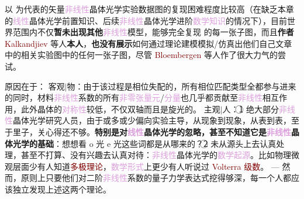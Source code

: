 以  为代表的矢量\textcolor{Plum}{非线性}\textcolor{PineGreen}{晶体光学}\textcolor{NavyBlue}{实验数据图}的复现困难程度比较高（在缺乏本章的\textcolor{Plum}{线性}\textcolor{PineGreen}{晶体光学}前置知识、后续\textcolor{Plum}{非线性}\textcolor{PineGreen}{晶体光学}进阶\textcolor{Plum}{数学知识}的情况下），目前世界范围内不仅\textbf{暂未出现其他}\textcolor{Plum}{非线性}模型，能够完全复现  的每一张子图，而且\textbf{作者} \textcolor{Maroon}{Kalkandjiev} 等人\textbf{本人}，\textbf{也没有展示}如何通过\textcolor{NavyBlue}{理论建模}模拟/仿真出他们自己文章中的\textcolor{NavyBlue}{相关实验图}中的任何一张\textcolor{NavyBlue}{子图}\cite{zolotovskayaSecondharmonicConicalRefraction2011,kroupaSecondharmonicConicalRefraction2010,alekseevaShadowConicalRefraction1999,shihConicalRefractionSecondHarmonic1969,schellLaserStudiesInternal1978,velichkinaDemonstrationPhenomenaConical1980,stroganovConicalRefractionSecond1980,illarionovExperimentalObservationConical1979,féveExperimentalStudyInternal1994,grantFrequencydoubledConicallyrefractedGaussian2014,maSumfrequencyGenerationFemtosecond2018,peetFrequencyDoublingLaser2011}，尽管 \textcolor{Maroon}{Bloembergen} 等人作了很大力气的尝试\cite{shihConicalRefractionSecondHarmonic1969,schellLaserStudiesInternal1978}。

原因在于：{\one} 客观$\Big|$物：由于该过程是\textcolor{PineGreen}{相位失配}的，所有\textcolor{PineGreen}{相位匹配类型}全都参与进来的同时，材料\textcolor{Plum}{非线性}系数的所有\textcolor{Plum}{非零张量元}/\textcolor{Plum}{分量}也几乎都贡献至\textcolor{Plum}{非线性}相互作用\cite{kroupaSecondharmonicConicalRefraction2010}，此外晶体的\textcolor{Plum}{对称性}较低，不仅\textcolor{NavyBlue}{双轴}而且是\textcolor{NavyBlue}{旋光}的\cite{zolotovskayaSecondharmonicConicalRefraction2011}。{\two} 主观$\Big|$人：\textcircled{1} 绝大部分\textcolor{Plum}{非线性}\textcolor{PineGreen}{晶体光学}研究人员，由于或多或少偏向\textcolor{NavyBlue}{实验主导}，从现象到现象，从表到表，至于里子，关心得还不够。\textbf{特别是对\textcolor{Plum}{线性}\textcolor{PineGreen}{晶体光学}的忽略，甚至不知道它是\textcolor{Plum}{非线性}\textcolor{PineGreen}{晶体光学}的基础}：想想看 \textcolor{PineGreen}{o} 光 \textcolor{PineGreen}{e} 光这些词都是从哪来的？\textcircled{2} 未从源头上去认真处理，甚至不打算、没有兴趣去认真对待：\textcolor{Plum}{非线性}\textcolor{PineGreen}{晶体光学}的\textcolor{Plum}{数学起源}。比如\textcolor{NavyBlue}{物理微观}层面少有人知道\textcolor{Maroon}{多极理论}，\textcolor{Plum}{数学形式}上更少有人听说过 \textcolor{Maroon}{Volterra 级数}。 --- 然而，原则上只要他们对二阶\textcolor{Plum}{非线性}系数的\textcolor{NavyBlue}{量子力学}表达式挖得够深，每一个人都应该独立发现上述这两个理论。

